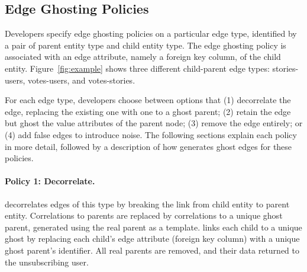 %

\subsection{Edge Ghosting Policies}
Developers specify edge ghosting policies on a particular edge type, identified by a pair of parent
entity type and child entity type. The edge ghosting policy is associated with an edge attribute,
namely a foreign key column, of the child entity. Figure~\ref{fig:example} shows three different
child-parent edge types: stories-users, votes-users, and votes-stories.

For each edge type, developers choose between options that (1) decorrelate the edge, replacing
the existing one with one to a ghost parent; (2) retain the edge but ghost the value attributes of the
parent node; (3) remove the edge entirely; or (4) add false edges to introduce noise.
The following sections explain each policy in more detail, followed by a description of how \sys
generates ghost edges for these policies.

\paragraph{Policy 1: Decorrelate.}
\sys decorrelates edges of this type by breaking the link from child entity to parent entity.
Correlations to parents are replaced by correlations to a unique ghost parent, generated using the
real parent as a template.  \sys links each child to a unique ghost by replacing each child's edge
attribute (foreign key column) with a unique ghost parent's identifier. 
All real parents are removed, and their data returned to the unsubscribing user.

